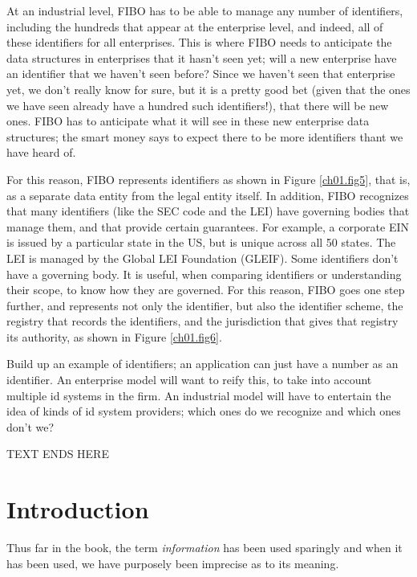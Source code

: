 At an industrial level, FIBO has to be able to manage any number of identifiers, including the hundreds that appear at the enterprise level, and indeed, all of these identifiers for all enterprises.  This is where FIBO needs to anticipate the data structures in enterprises that it hasn't seen yet; will a new enterprise have an identifier that we haven't seen before?  Since we haven't seen that enterprise yet, we don't really know for sure, but it is a pretty good bet (given that the ones we have seen already have a hundred such identifiers!), that there will be new ones.  FIBO has to anticipate what it will see in these new enterprise data structures; the smart money says to expect there to be more identifiers thant we have heard of. 

For this reason, FIBO represents identifiers as shown in Figure \ref{ch01.fig5}, that is, as a separate data entity from the legal entity itself.  In addition, FIBO recognizes that many identifiers (like the SEC code and the LEI) have governing bodies that manage them, and that provide certain guarantees.  For example, a corporate EIN is issued by a particular state in the US, but is unique across all 50 states.  The LEI is managed by the Global LEI Foundation (GLEIF).  Some identifiers don't have a governing body.  It is useful, when comparing identifiers or understanding their scope, to know how they are governed.  For this reason, FIBO goes one step further, and represents not only the identifier, but also the identifier scheme, the registry that records the identifiers, and the jurisdiction that gives that registry its authority, as shown in Figure \ref{ch01.fig6}.






Build up an example of identifiers; an application can just have a number as an identifier.  An enterprise model will want to reify this, to take into account multiple id systems in the firm.  An industrial model will have to entertain the idea of kinds of id system providers; which ones do we recognize and which ones don't we? 




TEXT ENDS HERE


\section{Introduction}

Thus far in the book, the term \textit{information}
%
has been used sparingly and when
it has been used, we have purposely been imprecise as to its meaning.



